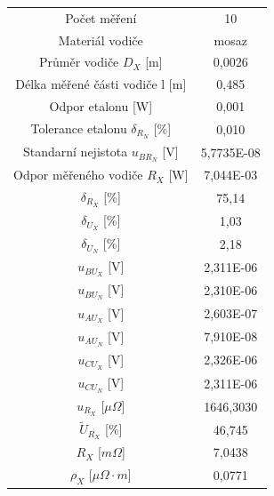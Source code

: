 \documentclass[a4paper, czech]{article}
\begin{document}
\begin{table}[H]
    \begin{tabular}{cc}
        \hline
        \cellcolor{lightgray}    Počet měření                     & \cellcolor{yellow!35} 10         \\
        \cellcolor{lightgray} Materiál vodiče                       & \cellcolor{yellow!35} mosaz      \\
        \cellcolor{lightgray} Průměr vodiče $D_X$ {[}m{]}              & \cellcolor{yellow!35} 0,0026     \\
        \cellcolor{lightgray} Délka měřené části vodiče l {[}m{]}   & \cellcolor{yellow!35} 0,485      \\
        \cellcolor{lightgray} Odpor etalonu {[}W{]}                 & \cellcolor{yellow!35} 0,001      \\
        \cellcolor{lightgray} Tolerance etalonu $\delta_{R_N}$ {[}\%{]}        & \cellcolor{yellow!35} 0,010      \\
        Standarní nejistota $u_{BR_N}$ {[}V{]}      & 5,7735E-08 \\
        Odpor měřeného vodiče $R_X$ {[}W{]}      & 7,044E-03  \\
        $\delta_{R_X}$ {[}\%{]}                          & 75,14      \\
        $\delta_{U_X}$ {[}\%{]}                          & 1,03       \\
        $\delta_{U_N}$ {[}\%{]}                          & 2,18       \\
        $u_{BU_X}$ {[}V{]}                          & 2,311E-06  \\
        $u_{BU_N}$ {[}V{]}                          & 2,310E-06  \\
        $u_{AU_X}$ {[}V{]}                          & 2,603E-07  \\
        $u_{AU_N}$ {[}V{]}                          & 7,910E-08  \\
        $u_{CU_X}$ {[}V{]}                          & 2,326E-06  \\
        $u_{CU_N}$ {[}V{]}                          & 2,311E-06  \\
        \cellcolor{lightgray} $u_{R_X}$ [$\mu \Omega$]                          & \cellcolor{yellow!35} 1646,3030  \\
        \cellcolor{lightgray} $\tilde{U}_{R_X}$ [\%]                     & \cellcolor{yellow!35} 46,745     \\
        \cellcolor{lightgray} $R_X$ [$m \Omega$]                  & \cellcolor{yellow!35} 7,0438     \\
        \cellcolor{lightgray} $\rho_X$ [$\mu \Omega \cdot m$]                       & \cellcolor{yellow!35} 0,0771        \\
        \hline
    \end{tabular}
\end{table}
\end{document}

